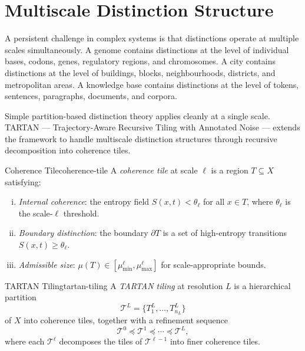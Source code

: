 \documentclass[12pt,twoside,openright]{book}
\begin{document}
\section{Multiscale Distinction Structure}

A persistent challenge in complex systems is that
distinctions operate at multiple scales simultaneously.
A genome contains distinctions at the level of
individual bases, codons, genes, regulatory regions,
and chromosomes. A city contains distinctions at the
level of buildings, blocks, neighbourhoods, districts,
and metropolitan areas. A knowledge base contains
distinctions at the level of tokens, sentences,
paragraphs, documents, and corpora.

Simple partition-based distinction theory applies
cleanly at a single scale. TARTAN — Trajectory-Aware
Recursive Tiling with Annotated Noise — extends the
framework to handle multiscale distinction structures
through recursive decomposition into coherence tiles.

\begin{definition}{Coherence Tile}{coherence-tile}
  A \emph{coherence tile} at scale $\ell$ is a region
  $T \subseteq X$ satisfying:
  \begin{enumerate}[(i)]
    \item \emph{Internal coherence}: the entropy field
          $S(x, t) < \theta_\ell$ for all $x \in T$,
          where $\theta_\ell$ is the scale-$\ell$
          threshold.
    \item \emph{Boundary distinction}: the boundary
          $\partial T$ is a set of high-entropy transitions
          $S(x,t) \ge \theta_\ell$.
    \item \emph{Admissible size}: $\mu(T) \in
          [\mu_{\min}^\ell, \mu_{\max}^\ell]$ for
          scale-appropriate bounds.
  \end{enumerate}
\end{definition}

\begin{definition}{TARTAN Tiling}{tartan-tiling}
  A \emph{TARTAN tiling} at resolution $L$ is a
  hierarchical partition
  \[
    \mathcal{T}^L = \{T^L_1, \ldots, T^L_{n_L}\}
  \]
  of $X$ into coherence tiles, together with a
  refinement sequence
  \[
    \mathcal{T}^0 \preceq \mathcal{T}^1 \preceq
    \cdots \preceq \mathcal{T}^L,
  \]
  where each $\mathcal{T}^\ell$ decomposes the tiles of
  $\mathcal{T}^{\ell-1}$ into finer coherence tiles.
\end{definition}
\end{document}
